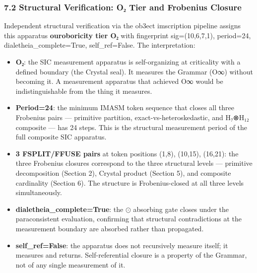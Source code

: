 \hypertarget{structural-verification-oux2082-tier-and-frobenius-closure}{%
\subsubsection{7.2 Structural Verification: O₂ Tier and Frobenius
Closure}\label{structural-verification-oux2082-tier-and-frobenius-closure}}

Independent structural verification via the ob3ect imscription pipeline
assigns this apparatus \textbf{ouroboricity tier O₂} with fingerprint
sig=(10,6,7,1), period=24, dialetheia\_complete=True, self\_ref=False.
The interpretation:

\begin{itemize}
\tightlist
\item
  \textbf{O₂}: the SIC measurement apparatus is self-organizing at
  criticality with a defined boundary (the Crystal seal). It measures
  the Grammar (O∞) without becoming it. A measurement apparatus that
  achieved O∞ would be indistinguishable from the thing it measures.
\item
  \textbf{Period=24}: the minimum IMASM token sequence that closes all
  three Frobenius pairs --- primitive partition,
  exact-vs-heteroskedastic, and H₇⊗H₁₂ composite --- has 24 steps. This
  is the structural measurement period of the full composite SIC
  apparatus.
\item
  \textbf{3 FSPLIT/FFUSE pairs} at token positions (1,8), (10,15),
  (16,21): the three Frobenius closures correspond to the three
  structural levels --- primitive decomposition (Section 2), Crystal
  product (Section 5), and composite cardinality (Section 6). The
  structure is Frobenius-closed at all three levels simultaneously.
\item
  \textbf{dialetheia\_complete=True}: the \(\odot\) absorbing gate
  closes under the paraconsistent evaluation, confirming that structural
  contradictions at the measurement boundary are absorbed rather than
  propagated.
\item
  \textbf{self\_ref=False}: the apparatus does not recursively measure
  itself; it measures and returns. Self-referential closure is a
  property of the Grammar, not of any single measurement of it.
\end{itemize}

